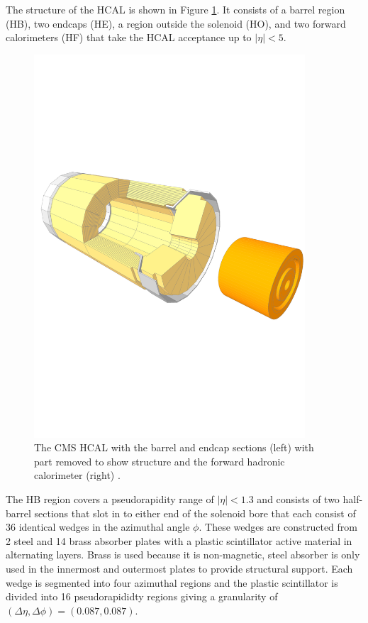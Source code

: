 The structure of the HCAL is shown in Figure \ref{fig:apparatus:hcal}. It consists of a barrel region (HB), two endcaps (HE), a region outside the solenoid (HO), and two forward calorimeters (HF) that take the HCAL acceptance up to $|\eta|<5$. 
\begin{figure}[h!]
    \includegraphics[width=0.9\textwidth]{figures/apparatus/HCAL_HF.pdf}
    \caption{The CMS HCAL with the barrel and endcap sections (left) with part removed to show structure and the forward hadronic calorimeter (right) \cite{SketchupCMS}.}
    \label{fig:apparatus:hcal}
\end{figure}
The HB region covers a pseudorapidity range of $|\eta|<1.3$ and consists of two half-barrel sections that slot in to either end of the solenoid bore that each consist of 36 identical wedges in the azimuthal angle $\phi$. These wedges are constructed from 2 steel and 14 brass absorber plates with a plastic scintillator active material in alternating layers. Brass is used because it is non-magnetic, steel absorber is only used in the innermost and outermost plates to provide structural support. Each wedge is segmented into four azimuthal regions and the plastic scintillator is divided into 16 pseudorapididty regions giving a granularity of $(\Delta\eta,\Delta\phi) = (0.087,0.087)$.
